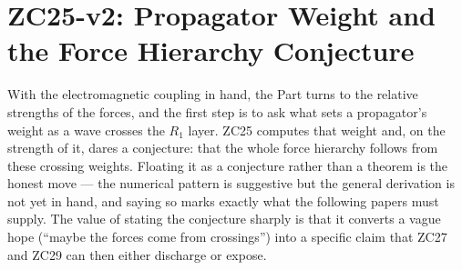 \documentclass[12pt, a4paper]{article}
\begin{document}
\section{ZC25-v2: Propagator Weight and the Force Hierarchy Conjecture}
\label{sec:zc25-propagator}

With the electromagnetic coupling in hand, the Part turns to the relative
strengths of the forces, and the first step is to ask what sets a propagator's
weight as a wave crosses the $R_1$ layer. ZC25 computes that weight and, on the
strength of it, dares a conjecture: that the whole force hierarchy follows from
these crossing weights. Floating it as a conjecture rather than a theorem is the
honest move --- the numerical pattern is suggestive but the general derivation is
not yet in hand, and saying so marks exactly what the following papers must
supply. The value of stating the conjecture sharply is that it converts a vague
hope (``maybe the forces come from crossings'') into a specific claim that ZC27
and ZC29 can then either discharge or expose.

\end{document}
